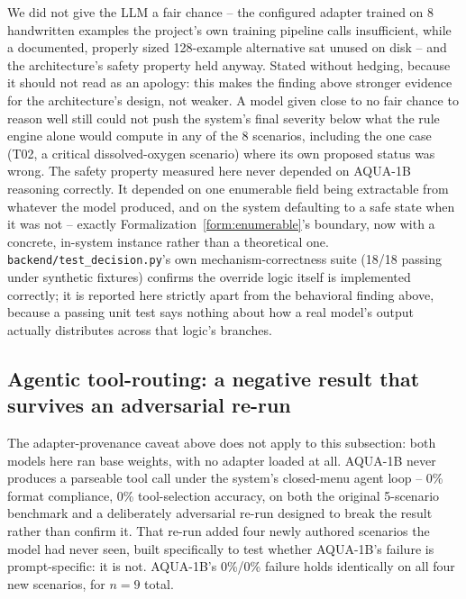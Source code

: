 We did not give the LLM a fair chance -- the configured adapter trained on 8 handwritten examples the
project's own training pipeline calls insufficient, while a documented, properly sized 128-example
alternative sat unused on disk -- and the architecture's safety property held anyway. Stated
without hedging, because it should not read as an apology: this makes the finding above stronger
evidence for the architecture's design, not weaker. A model given close to no fair chance to reason
well still could not push the system's final severity below what the rule engine alone would
compute in any of the 8 scenarios, including the one case (T02, a critical dissolved-oxygen
scenario) where its own proposed status was wrong. The safety property measured here never
depended on AQUA-1B reasoning correctly. It depended on one enumerable field being extractable from
whatever the model produced, and on the system defaulting to a safe state when it was not --
exactly Formalization~\ref{form:enumerable}'s boundary, now with a concrete, in-system instance
rather than a theoretical one. \texttt{backend/test\_decision.py}'s own mechanism-correctness suite
(18/18 passing under synthetic fixtures) confirms the override logic itself is implemented
correctly; it is reported here strictly apart from the behavioral finding above, because a passing
unit test says nothing about how a real model's output actually distributes across that logic's
branches.

\subsection{Agentic tool-routing: a negative result that survives an adversarial re-run}
\label{sec:results-agentic}

The adapter-provenance caveat above does not apply to this subsection: both models here ran base
weights, with no adapter loaded at all. AQUA-1B never produces a parseable tool call under the
system's closed-menu agent loop -- 0\% format compliance, 0\% tool-selection accuracy, on both the
original 5-scenario benchmark and a deliberately adversarial re-run designed to break the
result rather than confirm it. That re-run added four newly authored scenarios the model had never
seen, built specifically to test whether AQUA-1B's failure is prompt-specific: it is not. AQUA-1B's
0\%/0\% failure holds identically on all four new scenarios, for $n=9$ total.

